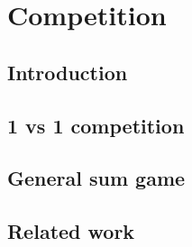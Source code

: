 \chapter{Competition}\label{ch:competition}
\section{Introduction}
\section{1 vs 1 competition}
\section{General sum game}
\section{Related work}